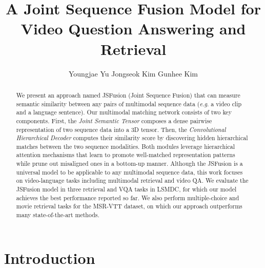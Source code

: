 \documentclass[runningheads]{llncs}
\makeatletter
\DeclareRobustCommand\onedot{\futurelet\@let@token\@onedot}
\def\onedot{.\@\xspace}
\def\eg{\textit{e.g}\onedot} \def\Eg{\textit{E.g}\onedot}
\makeatother
\begin{document}
\pagestyle{headings}
\mainmatter

\title{A Joint Sequence Fusion Model for Video Question Answering and Retrieval} 






\author{Youngjae Yu \hspace{9pt} Jongseok Kim \hspace{9pt} Gunhee Kim}
 



\maketitle
\begin{abstract}
We present an approach named JSFusion (Joint Sequence Fusion) that can measure semantic similarity between any pairs of multimodal sequence data (\eg a video clip and a language sentence).
Our multimodal matching network consists of two key components. First, the \textit{Joint Semantic Tensor} composes a dense pairwise representation of two sequence data into a 3D tensor.
Then, the \textit{Convolutional Hierarchical Decoder} computes their similarity score by discovering hidden hierarchical matches between the two sequence modalities.  Both modules leverage hierarchical attention mechanisms that learn to promote well-matched representation patterns while prune out misaligned ones in a bottom-up manner.
Although the JSFusion is a universal model to be applicable to any multimodal sequence data, this work focuses on video-language tasks including multimodal retrieval and video QA.  
We evaluate the JSFusion model in three retrieval and VQA tasks in LSMDC, for which our model achieves the best performance reported so far. 
We also perform multiple-choice and movie retrieval tasks for the MSR-VTT dataset, on which our approach outperforms many state-of-the-art methods. 
\end{abstract}

\section{Introduction}
\label{sec:introduction}
\end{document}
